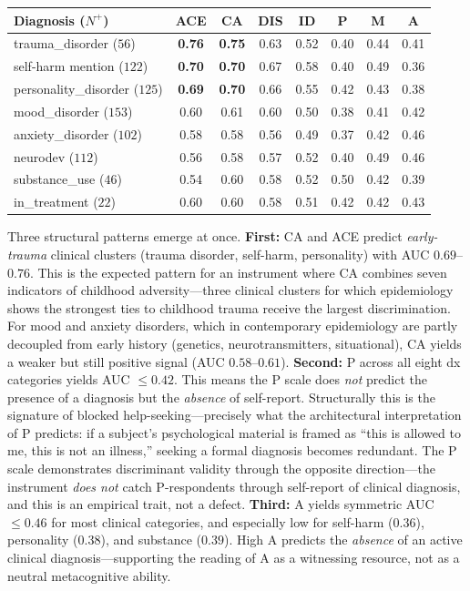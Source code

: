 \begin{center}
\small
\begin{tabular}{lccccccc}
\toprule
Diagnosis ($N^+$)         & ACE  & CA   & DIS  & ID   & P    & M    & A    \\
\midrule
trauma\_disorder ($56$)      & \textbf{0.76} & \textbf{0.75} & 0.63 & 0.52 & 0.40 & 0.44 & 0.41 \\
self-harm mention ($122$)    & \textbf{0.70} & \textbf{0.70} & 0.67 & 0.58 & 0.40 & 0.49 & 0.36 \\
personality\_disorder ($125$) & \textbf{0.69} & \textbf{0.70} & 0.66 & 0.55 & 0.42 & 0.43 & 0.38 \\
mood\_disorder ($153$)        & 0.60 & 0.61 & 0.60 & 0.50 & 0.38 & 0.41 & 0.42 \\
anxiety\_disorder ($102$)     & 0.58 & 0.58 & 0.56 & 0.49 & 0.37 & 0.42 & 0.46 \\
neurodev ($112$)             & 0.56 & 0.58 & 0.57 & 0.52 & 0.40 & 0.49 & 0.46 \\
substance\_use ($46$)         & 0.54 & 0.60 & 0.58 & 0.52 & 0.50 & 0.42 & 0.39 \\
in\_treatment ($22$)          & 0.60 & 0.60 & 0.58 & 0.51 & 0.42 & 0.42 & 0.43 \\
\bottomrule
\end{tabular}
\end{center}

Three structural patterns emerge at once. \textbf{First:} CA and ACE predict \emph{early-trauma} clinical clusters (trauma disorder, self-harm, personality) with AUC $0.69$--$0.76$. This is the expected pattern for an instrument where CA combines seven indicators of childhood adversity---three clinical clusters for which epidemiology shows the strongest ties to childhood trauma receive the largest discrimination. For mood and anxiety disorders, which in contemporary epidemiology are partly decoupled from early history (genetics, neurotransmitters, situational), CA yields a weaker but still positive signal (AUC $0.58$--$0.61$). \textbf{Second:} P across all eight dx categories yields AUC $\leq 0.42$. This means the P scale does \emph{not} predict the presence of a diagnosis but the \emph{absence} of self-report. Structurally this is the signature of blocked help-seeking---precisely what the architectural interpretation of P predicts: if a subject's psychological material is framed as ``this is allowed to me, this is not an illness,'' seeking a formal diagnosis becomes redundant. The P scale demonstrates discriminant validity through the opposite direction---the instrument \emph{does not} catch P-respondents through self-report of clinical diagnosis, and this is an empirical trait, not a defect. \textbf{Third:} A yields symmetric AUC $\leq 0.46$ for most clinical categories, and especially low for self-harm ($0.36$), personality ($0.38$), and substance ($0.39$). High A predicts the \emph{absence} of an active clinical diagnosis---supporting the reading of A as a witnessing resource, not as a neutral metacognitive ability.


